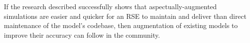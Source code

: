 If the research described successfully shows that aspectually-augmented
simulations are easier and quicker for an RSE to maintain and deliver than
direct maintenance of the model's codebase, then augmentation of existing models
to improve their accuracy can follow in the community.
    



    








